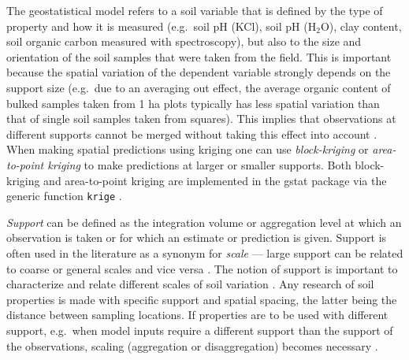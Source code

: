 \documentclass[graybox,natbib,nospthms,UStrade]{svmono}
\begin{document}
The geostatistical model refers to a soil variable that is defined by
the type of property and how it is measured (e.g.~soil pH (KCl), soil pH
(H\(_2\)O), clay content, soil organic carbon measured with spectroscopy),
but also to the size and orientation of the soil samples that were taken
from the field. This is important because the spatial variation of the
dependent variable strongly depends on the support size (e.g.~due to an
averaging out effect, the average organic content of bulked samples taken
from 1 ha plots typically has less spatial variation than that of single
soil samples taken from squares). This implies that observations at
different supports cannot be merged without taking this effect into
account \citep{Webster2001Wiley}. When making spatial predictions using
kriging one can use \emph{block-kriging} \citep{Webster2001Wiley} or
\emph{area-to-point kriging} \citep{Kyriakidis2004GEAN1135} to make predictions at
larger or smaller supports. Both block-kriging and area-to-point kriging
are implemented in the gstat package via the generic function \texttt{krige} \citep{Pebesma2004CG}.

\emph{Support} can be defined as the integration volume or aggregation level
at which an observation is taken or for which an estimate or prediction
is given. Support is often used in the literature as a synonym for
\emph{scale} --- large support can be related to coarse or general scales and
vice versa \citep{Hengl2006CG}. The notion of support is important to
characterize and relate different scales of soil variation
\citep{schabenberger2005statistical}. Any research of soil properties is made
with specific support and spatial spacing, the latter being the distance
between sampling locations. If properties are to be used with different
support, e.g.~when model inputs require a different support than the
support of the observations, scaling (aggregation or disaggregation)
becomes necessary \citep{Heuvelink1999Geoderma}.
\end{document}
